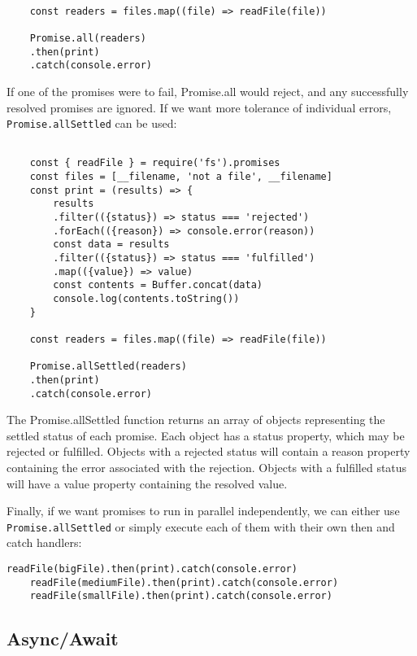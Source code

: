 \documentclass{scrartcl}
\begin{document}
\begin{lstlisting}[style=ES6]

    const readers = files.map((file) => readFile(file))

    Promise.all(readers)
    .then(print)
    .catch(console.error)

\end{lstlisting}

If one of the promises were to fail, Promise.all would reject, and any successfully resolved promises are ignored. If we want more tolerance of individual errors, \lstinline|Promise.allSettled| can be used:

\begin{lstlisting}[style=ES6]

    const { readFile } = require('fs').promises
    const files = [__filename, 'not a file', __filename]
    const print = (results) => {
        results
        .filter(({status}) => status === 'rejected')
        .forEach(({reason}) => console.error(reason))
        const data = results
        .filter(({status}) => status === 'fulfilled')
        .map(({value}) => value)
        const contents = Buffer.concat(data)
        console.log(contents.toString())
    }

    const readers = files.map((file) => readFile(file))

    Promise.allSettled(readers)
    .then(print)
    .catch(console.error)

\end{lstlisting}

The Promise.allSettled function returns an array of objects representing the settled status of each promise. Each object has a status property, which may be rejected or fulfilled. Objects with a rejected status will contain a reason property containing the error associated with the rejection. Objects with a fulfilled status will have a value property containing the resolved value.

Finally, if we want promises to run in parallel independently, we can either use \lstinline|Promise.allSettled| or simply execute each of them with their own then and catch handlers:

\begin{lstlisting}[style=ES6]
    readFile(bigFile).then(print).catch(console.error)
    readFile(mediumFile).then(print).catch(console.error)
    readFile(smallFile).then(print).catch(console.error)
\end{lstlisting}

\subsection{Async/Await}
\end{document}

